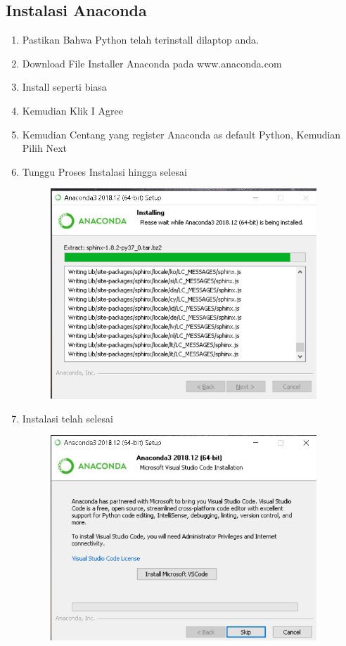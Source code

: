 \subsection{Instalasi Anaconda}
\begin{enumerate}
    \item Pastikan Bahwa Python telah terinstall dilaptop anda.
    \item Download File Installer Anaconda pada www.anaconda.com
    \item Install seperti biasa 
    \item Kemudian Klik I Agree
    \item Kemudian Centang yang register Anaconda as default Python, Kemudian Pilih Next
    \item Tunggu Proses Instalasi hingga selesai
    \begin{figure}[H]
		\includegraphics[width=10cm]{figures/fahmi/1.png}
		\centering
	\end{figure}

    \item Instalasi telah selesai
	 \begin{figure}[H]
		\includegraphics[width=10cm]{figures/fahmi/2.png}
		\centering
	\end{figure}
	
\end{enumerate}
	

